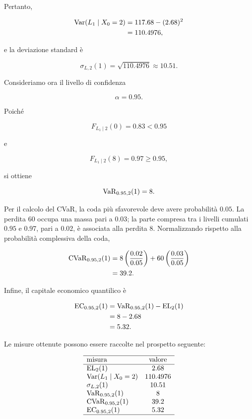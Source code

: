Pertanto,

\[
\begin{split}
\operatorname{Var}(L_1\mid X_0=2)
&=
117.68-(2.68)^2
\\
&=
110.4976,
\end{split}
\]

e la deviazione standard \`{e}

\[
\sigma_{L,2}(1)
=
\sqrt{110.4976}
\approx
10.51.
\]

Consideriamo ora il livello di confidenza

\[
\alpha=0.95.
\]

Poich\'{e}

\[
F_{L_1\mid 2}(0)=0.83<0.95
\]

e

\[
F_{L_1\mid 2}(8)=0.97\geq0.95,
\]

si ottiene

\[
\operatorname{VaR}_{0.95,2}(1)=8.
\]

Per il calcolo del CVaR, la coda pi\`{u} sfavorevole deve avere
probabilit\`{a} $0.05$. La perdita $60$ occupa una massa pari a
$0.03$; la parte compresa tra i livelli cumulati $0.95$ e $0.97$,
pari a $0.02$, \`{e} associata alla perdita $8$. Normalizzando rispetto
alla probabilit\`{a} complessiva della coda,

\[
\begin{split}
\operatorname{CVaR}_{0.95,2}(1)
&=
8\left(\frac{0.02}{0.05}\right)
+
60\left(\frac{0.03}{0.05}\right)
\\
&=
39.2.
\end{split}
\]

Infine, il capitale economico quantilico \`{e}

\[
\begin{split}
\mathrm{EC}_{0.95,2}(1)
&=
\operatorname{VaR}_{0.95,2}(1)
-
\mathrm{EL}_2(1)
\\
&=
8-2.68
\\
&=
5.32.
\end{split}
\]

Le misure ottenute possono essere raccolte nel prospetto seguente:

\[
\begin{array}{lc}
\hline
\text{misura}
&
\text{valore}
\\
\hline
\mathrm{EL}_2(1)
&
2.68
\\
\operatorname{Var}(L_1\mid X_0=2)
&
110.4976
\\
\sigma_{L,2}(1)
&
10.51
\\
\operatorname{VaR}_{0.95,2}(1)
&
8
\\
\operatorname{CVaR}_{0.95,2}(1)
&
39.2
\\
\mathrm{EC}_{0.95,2}(1)
&
5.32
\\
\hline
\end{array}
\]


